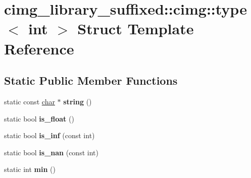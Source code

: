 \hypertarget{structcimg__library__suffixed_1_1cimg_1_1type_3_01int_01_4}{}\section{cimg\+\_\+library\+\_\+suffixed\+:\+:cimg\+:\+:type$<$ int $>$ Struct Template Reference}
\label{structcimg__library__suffixed_1_1cimg_1_1type_3_01int_01_4}
\subsection*{Static Public Member Functions}
\begin{DoxyCompactItemize}
\item 
\mbox{\label{structcimg__library__suffixed_1_1cimg_1_1type_3_01int_01_4_a2a3cf03afd06420fc6e1b5cac03f022d}} 
static const \hyperlink{classchar}{char} $\ast$ {\bfseries string} ()
\item 
\mbox{\label{structcimg__library__suffixed_1_1cimg_1_1type_3_01int_01_4_ac05fc705913ee8d0e29fa2ed70ac773f}} 
static bool {\bfseries is\+\_\+float} ()
\item 
\mbox{\label{structcimg__library__suffixed_1_1cimg_1_1type_3_01int_01_4_add5d37e2cf5c48e76a1129e8f013b6ee}} 
static bool {\bfseries is\+\_\+inf} (const int)
\item 
\mbox{\label{structcimg__library__suffixed_1_1cimg_1_1type_3_01int_01_4_ad9f09500c3c154feff1ceb6a1ec655c1}} 
static bool {\bfseries is\+\_\+nan} (const int)
\item 
\mbox{\label{structcimg__library__suffixed_1_1cimg_1_1type_3_01int_01_4_ae9073668a36e876421e817427a4fc8e7}} 
static int {\bfseries min} ()
\item 
\mbox{\label{structcimg__library__suffixed_1_1cimg_1_1type_3_01int_01_4_aebf325cf7fe739a51474dd4dcb0f6ca7}} 

\end{DoxyCompactItemize}
